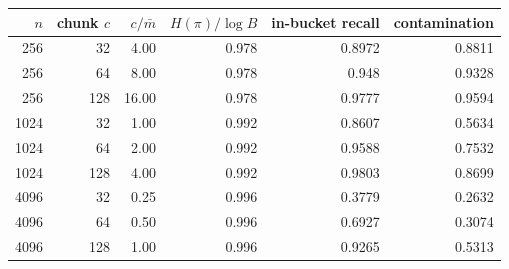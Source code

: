 \begin{tabular}{rrrrrr}
\toprule
$n$ & chunk $c$ & $c / \bar{m}$ & $H(\pi)/\log B$ & in-bucket recall & contamination \\
\midrule
256 & 32 & 4.00 & 0.978 & 0.8972 & 0.8811 \\
256 & 64 & 8.00 & 0.978 & 0.948 & 0.9328 \\
256 & 128 & 16.00 & 0.978 & 0.9777 & 0.9594 \\
1024 & 32 & 1.00 & 0.992 & 0.8607 & 0.5634 \\
1024 & 64 & 2.00 & 0.992 & 0.9588 & 0.7532 \\
1024 & 128 & 4.00 & 0.992 & 0.9803 & 0.8699 \\
4096 & 32 & 0.25 & 0.996 & 0.3779 & 0.2632 \\
4096 & 64 & 0.50 & 0.996 & 0.6927 & 0.3074 \\
4096 & 128 & 1.00 & 0.996 & 0.9265 & 0.5313 \\
\bottomrule
\end{tabular}